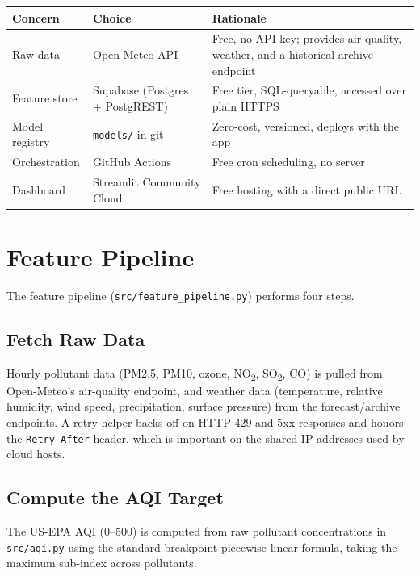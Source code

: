 \documentclass[11pt,a4paper]{article}
\begin{document}
\begin{center}
\begin{tabular}{@{}p{3.2cm}p{4.2cm}p{6.0cm}@{}}
\toprule
\textbf{Concern} & \textbf{Choice} & \textbf{Rationale} \\
\midrule
Raw data & Open-Meteo API & Free, no API key; provides air-quality, weather, and a historical archive endpoint \\
Feature store & Supabase (Postgres + PostgREST) & Free tier, SQL-queryable, accessed over plain HTTPS \\
Model registry & \texttt{models/} in git & Zero-cost, versioned, deploys with the app \\
Orchestration & GitHub Actions & Free cron scheduling, no server \\
Dashboard & Streamlit Community Cloud & Free hosting with a direct public URL \\
\bottomrule
\end{tabular}
\end{center}

\section{Feature Pipeline}
The feature pipeline (\texttt{src/feature\_pipeline.py}) performs four steps.

\subsection{Fetch Raw Data}
Hourly pollutant data (PM2.5, PM10, ozone, NO\textsubscript{2},
SO\textsubscript{2}, CO) is pulled from Open-Meteo's air-quality endpoint, and
weather data (temperature, relative humidity, wind speed, precipitation,
surface pressure) from the forecast/archive endpoints. A retry helper backs off
on HTTP 429 and 5xx responses and honors the \texttt{Retry-After} header, which
is important on the shared IP addresses used by cloud hosts.

\subsection{Compute the AQI Target}
The US-EPA AQI (0--500) is computed from raw pollutant concentrations in
\texttt{src/aqi.py} using the standard breakpoint piecewise-linear formula,
taking the maximum sub-index across pollutants.
\end{document}
